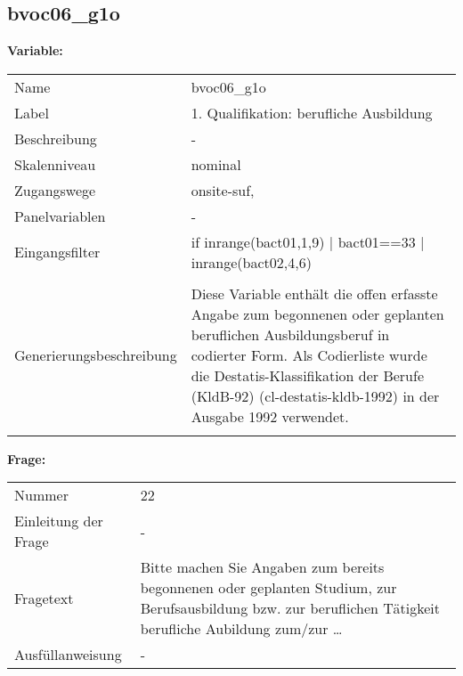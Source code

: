 	
	
	\subsection{bvoc06\_g1o}
	\label{subSection:bvoc06_g1o}

	\noindent\textbf{Variable:}\\
		\begin{tabular}{lL{11.3cm}}
			\label{tableVariable:bvoc06_g1o}
			Name & bvoc06\_g1o \\
			Label & 1. Qualifikation: berufliche Ausbildung \\
			Beschreibung & - \\
			Skalenniveau & nominal \\
			Zugangswege &
				onsite-suf,
 \\
			Panelvariablen & -
			 \\
			Eingangsfilter & if inrange(bact01,1,9) | bact01==33 | inrange(bact02,4,6)  \\
 \\
					Generierungsbeschreibung & Diese Variable enthält die offen erfasste Angabe zum begonnenen oder geplanten beruflichen Ausbildungsberuf in codierter Form. Als Codierliste wurde die Destatis-Klassifikation der Berufe (KldB-92) (cl-destatis-kldb-1992) in der Ausgabe 1992 verwendet. 
				 \\	
			 \\
		\end{tabular}

		\vspace*{1 cm}
		\noindent\textbf{Frage:}\\
		\begin{tabular}{lL{11.3cm}}
			\label{tableQuestion:bvoc06_g1o}
			Nummer & 22 \\
			Einleitung der Frage & - \\
			Fragetext & Bitte machen Sie Angaben zum bereits begonnenen oder geplanten Studium, zur Berufsausbildung bzw. zur beruflichen Tätigkeit
berufliche Aubildung zum/zur … \\
			Ausfüllanweisung & - \\
		\end{tabular}





